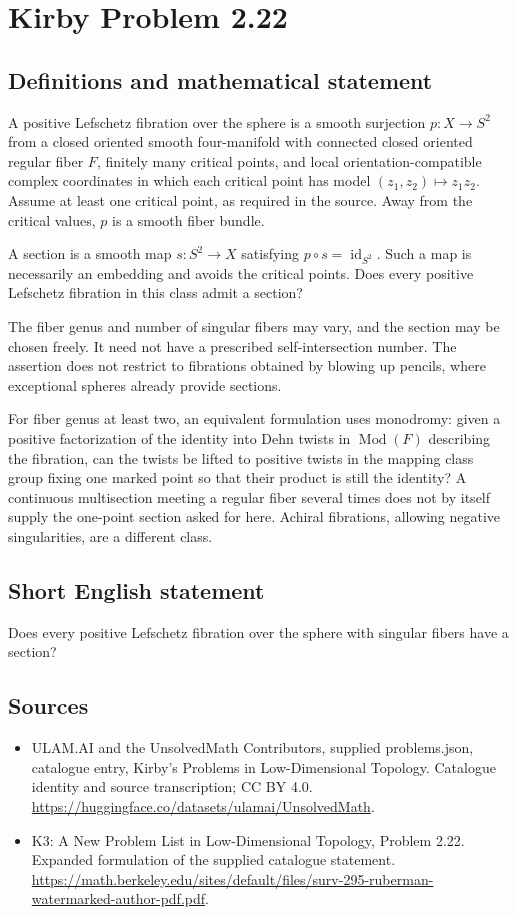 \documentclass[11pt,a4paper]{article}
\begin{document}
\section*{Kirby Problem 2.22}\label{statement}

\subsection{Definitions and mathematical statement}
A positive Lefschetz fibration over the sphere is a smooth surjection $p:X\to S^2$ from a closed oriented smooth four-manifold with connected closed oriented regular fiber $F$, finitely many critical points, and local orientation-compatible complex coordinates in which each critical point has model $(z_1,z_2)\mapsto z_1z_2$. Assume at least one critical point, as required in the source. Away from the critical values, $p$ is a smooth fiber bundle.

A section is a smooth map $s:S^2\to X$ satisfying $p\circ s=\operatorname{id}_{S^2}$. Such a map is necessarily an embedding and avoids the critical points. Does every positive Lefschetz fibration in this class admit a section?

The fiber genus and number of singular fibers may vary, and the section may be chosen freely. It need not have a prescribed self-intersection number. The assertion does not restrict to fibrations obtained by blowing up pencils, where exceptional spheres already provide sections.

For fiber genus at least two, an equivalent formulation uses monodromy: given a positive factorization of the identity into Dehn twists in $\operatorname{Mod}(F)$ describing the fibration, can the twists be lifted to positive twists in the mapping class group fixing one marked point so that their product is still the identity? A continuous multisection meeting a regular fiber several times does not by itself supply the one-point section asked for here. Achiral fibrations, allowing negative singularities, are a different class.
\subsection{Short English statement}
Does every positive Lefschetz fibration over the sphere with singular fibers have a section?
\subsection{Sources}
\begin{itemize}
\item[S1] ULAM.AI and the UnsolvedMath Contributors, supplied problems.json, catalogue entry, Kirby's Problems in Low-Dimensional Topology. Catalogue identity and source transcription; CC BY 4.0.
\url{https://huggingface.co/datasets/ulamai/UnsolvedMath}.
\item[S2] K3: A New Problem List in Low-Dimensional Topology, Problem 2.22. Expanded formulation of the supplied catalogue statement.
\url{https://math.berkeley.edu/sites/default/files/surv-295-ruberman-watermarked-author-pdf.pdf}.
\end{itemize}
\end{document}
